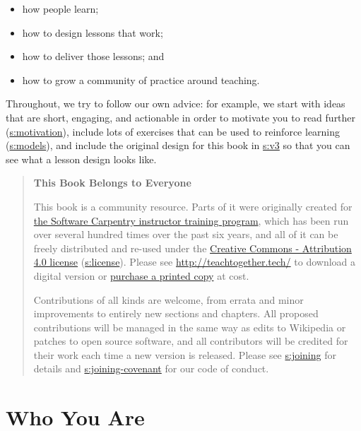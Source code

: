 \begin{itemize}
\tightlist
\item
  how people learn;
\item
  how to design lessons that work;
\item
  how to deliver those lessons; and
\item
  how to grow a community of practice around teaching.
\end{itemize}

Throughout, we try to follow our own advice: for example, we start with
ideas that are short, engaging, and actionable in order to motivate you
to read further (\protect\hyperlink{CHAPTER}{s:motivation}), include lots of exercises
that can be used to reinforce learning (\protect\hyperlink{CHAPTER}{s:models}), and
include the original design for this book in \protect\hyperlink{APPENDIX}{s:v3} so that
you can see what a lesson design looks like.

\begin{quote}\setlength{\parindent}{0pt}
\textbf{This Book Belongs to Everyone}

This book is a community resource. Parts of it were originally
created for \href{http://carpentries.github.io/instructor-training/}{the Software Carpentry instructor training
program}, which has been run over several
hundred times over the past six years, and all of it can be freely
distributed and re-used under the \href{https://creativecommons.org/licenses/by/4.0/}{Creative Commons - Attribution
4.0 license} (\protect\hyperlink{APPENDIX}{s:license}). Please see
\url{http://teachtogether.tech/} to download a digital version
or \href{http://www.lulu.com/commerce/index.php?fBuyContent=23123539}{purchase a printed copy} at cost.

Contributions of all kinds are welcome, from errata and minor
improvements to entirely new sections and chapters. All proposed
contributions will be managed in the same way as edits to Wikipedia
or patches to open source software, and all contributors will be
credited for their work each time a new version is released. Please
see \protect\hyperlink{APPENDIX}{s:joining} for details and
\protect\hyperlink{SECTION}{s:joining-covenant} for our code of conduct.
\end{quote}

\section{Who You Are}\label{s:intro-audience}

